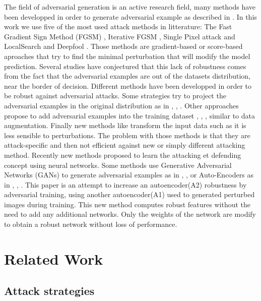 \documentclass[12pt]{article}
\begin{document}
The field of adversarial generation is an active research field, many methods have been developped in order to generate adversarial example as described in \cite{yuan_adversarial_2017}.
In this work we use five of the most used attack methods in litterature:
The Fast  Gradient Sign  Method  (FGSM)  \cite{goodfellow_explaining_2014}, Iterative FGSM \cite{kurakin_adversarial_2016},  Single Pixel attack and LocalSearch \cite{narodytska_simple_2016} and  Deepfool  \cite{moosavi-dezfooli_deepfool:_2015}.
Those methods are gradient-based or score-based aproaches that try to find the minimal perturbation that will modify the model prediction.
Several studies have conjectured that this lack of robustness comes from the fact that the adversarial examples are out of the datasets distribution, near the border of decision. Different methods have been developped in order to be robust against adversarial attacks.
Some strategies try to project the adversarial examples in the original distribution as in  \cite{meng_magnet:_2017}, \cite{samangouei_defense-gan:_2018}, \cite{santhanam_defending_2018}. Other approaches propose to add adversarial examples into the training dataset \cite{szegedy_intriguing_2013}, \cite{goodfellow_explaining_2014}, \cite{moosavi-dezfooli_deepfool:_2015}, similar to data augmentation. Finally new methods like \cite{munusamy_kabilan_vectordefense:_2018} transform the input data such as it is less sensible to perturbations. The problem with those methods is that they are attack-specific and then not efficient against new or simply different attacking method. Recently new methods proposed to learn the attacking et defending concept using neural networks. Some methods use Generative Adversarial Networks (GANs) to generate adversarial examples as in \cite{samangouei_defense-gan:_2018}, \cite{shen_ape-gan:_2017}, \cite{lee_generative_2017} or Auto-Encoders as in \cite{folz_adversarial_2018}, \cite{srinivasan_counterstrike:_2018}, \cite{baluja_learning_nodate}. This paper is an attempt to increase an autoencoder(A2) robustness by adversarial training, using another autoencoder(A1) used to generated perturbed images during training. This new method computes robust features without the need to add any additional networks. Only the weights of the network are modify to obtain a robust network without loss of performance.

\section{Related Work}
\subsection{Attack strategies}
\end{document}
